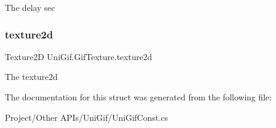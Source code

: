 The delay sec 

\mbox{\label{struct_uni_gif_1_1_gif_texture_a29f6af15d9586257ed3bf7592189f416}} 
\subsubsection{\texorpdfstring{texture2d}{texture2d}}
{\footnotesize\ttfamily Texture2D Uni\+Gif.\+Gif\+Texture.\+texture2d}



The texture2d 



The documentation for this struct was generated from the following file\+:\begin{DoxyCompactItemize}
\item 
Project/\+Other A\+P\+Is/\+Uni\+Gif/Uni\+Gif\+Const.\+cs\end{DoxyCompactItemize}
